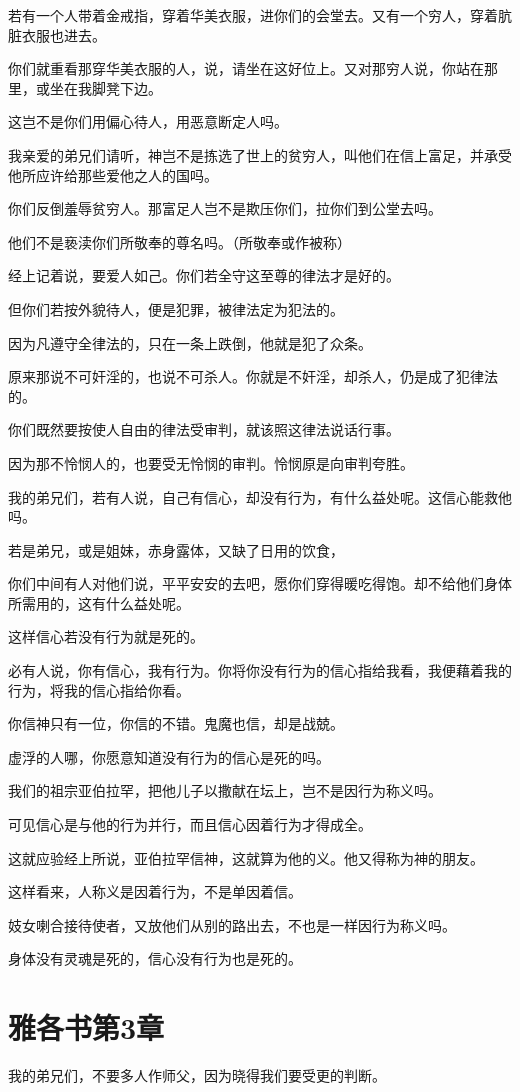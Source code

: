 \documentclass[12pt,oneside]{book}
\begin{document}
若有一个人带着金戒指，穿着华美衣服，进你们的会堂去。又有一个穷人，穿着肮脏衣服也进去。

你们就重看那穿华美衣服的人，说，请坐在这好位上。又对那穷人说，你站在那里，或坐在我脚凳下边。

这岂不是你们用偏心待人，用恶意断定人吗。

我亲爱的弟兄们请听，神岂不是拣选了世上的贫穷人，叫他们在信上富足，并承受他所应许给那些爱他之人的国吗。

你们反倒羞辱贫穷人。那富足人岂不是欺压你们，拉你们到公堂去吗。

他们不是亵渎你们所敬奉的尊名吗。（所敬奉或作被称）

经上记着说，要爱人如己。你们若全守这至尊的律法才是好的。

但你们若按外貌待人，便是犯罪，被律法定为犯法的。

因为凡遵守全律法的，只在一条上跌倒，他就是犯了众条。

原来那说不可奸淫的，也说不可杀人。你就是不奸淫，却杀人，仍是成了犯律法的。

你们既然要按使人自由的律法受审判，就该照这律法说话行事。

因为那不怜悯人的，也要受无怜悯的审判。怜悯原是向审判夸胜。

我的弟兄们，若有人说，自己有信心，却没有行为，有什么益处呢。这信心能救他吗。

若是弟兄，或是姐妹，赤身露体，又缺了日用的饮食，

你们中间有人对他们说，平平安安的去吧，愿你们穿得暖吃得饱。却不给他们身体所需用的，这有什么益处呢。

这样信心若没有行为就是死的。

必有人说，你有信心，我有行为。你将你没有行为的信心指给我看，我便藉着我的行为，将我的信心指给你看。

你信神只有一位，你信的不错。鬼魔也信，却是战兢。

虚浮的人哪，你愿意知道没有行为的信心是死的吗。

我们的祖宗亚伯拉罕，把他儿子以撒献在坛上，岂不是因行为称义吗。

可见信心是与他的行为并行，而且信心因着行为才得成全。

这就应验经上所说，亚伯拉罕信神，这就算为他的义。他又得称为神的朋友。

这样看来，人称义是因着行为，不是单因着信。

妓女喇合接待使者，又放他们从别的路出去，不也是一样因行为称义吗。

身体没有灵魂是死的，信心没有行为也是死的。

\chapter{雅各书第3章}
我的弟兄们，不要多人作师父，因为晓得我们要受更的判断。
\end{document}
